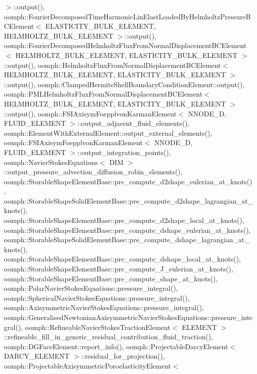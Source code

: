 $>$\+::output(), oomph\+::\+Fourier\+Decomposed\+Time\+Harmonic\+Lin\+Elast\+Loaded\+By\+Helmholtz\+Pressure\+B\+C\+Element$<$ E\+L\+A\+S\+T\+I\+C\+I\+T\+Y\+\_\+\+B\+U\+L\+K\+\_\+\+E\+L\+E\+M\+E\+N\+T, H\+E\+L\+M\+H\+O\+L\+T\+Z\+\_\+\+B\+U\+L\+K\+\_\+\+E\+L\+E\+M\+E\+N\+T $>$\+::output(), oomph\+::\+Fourier\+Decomposed\+Helmholtz\+Flux\+From\+Normal\+Displacement\+B\+C\+Element$<$ H\+E\+L\+M\+H\+O\+L\+T\+Z\+\_\+\+B\+U\+L\+K\+\_\+\+E\+L\+E\+M\+E\+N\+T, E\+L\+A\+S\+T\+I\+C\+I\+T\+Y\+\_\+\+B\+U\+L\+K\+\_\+\+E\+L\+E\+M\+E\+N\+T $>$\+::output(), oomph\+::\+Helmholtz\+Flux\+From\+Normal\+Displacement\+B\+C\+Element$<$ H\+E\+L\+M\+H\+O\+L\+T\+Z\+\_\+\+B\+U\+L\+K\+\_\+\+E\+L\+E\+M\+E\+N\+T, E\+L\+A\+S\+T\+I\+C\+I\+T\+Y\+\_\+\+B\+U\+L\+K\+\_\+\+E\+L\+E\+M\+E\+N\+T $>$\+::output(), oomph\+::\+Clamped\+Hermite\+Shell\+Boundary\+Condition\+Element\+::output(), oomph\+::\+P\+M\+L\+Helmholtz\+Flux\+From\+Normal\+Displacement\+B\+C\+Element$<$ H\+E\+L\+M\+H\+O\+L\+T\+Z\+\_\+\+B\+U\+L\+K\+\_\+\+E\+L\+E\+M\+E\+N\+T, E\+L\+A\+S\+T\+I\+C\+I\+T\+Y\+\_\+\+B\+U\+L\+K\+\_\+\+E\+L\+E\+M\+E\+N\+T $>$\+::output(), oomph\+::\+F\+S\+I\+Axisym\+Foepplvon\+Karman\+Element$<$ N\+N\+O\+D\+E\+\_\+D, F\+L\+U\+I\+D\+\_\+\+E\+L\+E\+M\+E\+N\+T $>$\+::output\+\_\+adjacent\+\_\+fluid\+\_\+elements(), oomph\+::\+Element\+With\+External\+Element\+::output\+\_\+external\+\_\+elements(), oomph\+::\+F\+S\+I\+Axisym\+Foepplvon\+Karman\+Element$<$ N\+N\+O\+D\+E\+\_\+D, F\+L\+U\+I\+D\+\_\+\+E\+L\+E\+M\+E\+N\+T $>$\+::output\+\_\+integration\+\_\+points(), oomph\+::\+Navier\+Stokes\+Equations$<$ D\+I\+M $>$\+::output\+\_\+pressure\+\_\+advection\+\_\+diffusion\+\_\+robin\+\_\+elements(), oomph\+::\+Storable\+Shape\+Element\+Base\+::pre\+\_\+compute\+\_\+d2shape\+\_\+eulerian\+\_\+at\+\_\+knots(), oomph\+::\+Storable\+Shape\+Solid\+Element\+Base\+::pre\+\_\+compute\+\_\+d2shape\+\_\+lagrangian\+\_\+at\+\_\+knots(), oomph\+::\+Storable\+Shape\+Element\+Base\+::pre\+\_\+compute\+\_\+d2shape\+\_\+local\+\_\+at\+\_\+knots(), oomph\+::\+Storable\+Shape\+Element\+Base\+::pre\+\_\+compute\+\_\+dshape\+\_\+eulerian\+\_\+at\+\_\+knots(), oomph\+::\+Storable\+Shape\+Solid\+Element\+Base\+::pre\+\_\+compute\+\_\+dshape\+\_\+lagrangian\+\_\+at\+\_\+knots(), oomph\+::\+Storable\+Shape\+Element\+Base\+::pre\+\_\+compute\+\_\+dshape\+\_\+local\+\_\+at\+\_\+knots(), oomph\+::\+Storable\+Shape\+Element\+Base\+::pre\+\_\+compute\+\_\+\+J\+\_\+eulerian\+\_\+at\+\_\+knots(), oomph\+::\+Storable\+Shape\+Element\+Base\+::pre\+\_\+compute\+\_\+shape\+\_\+at\+\_\+knots(), oomph\+::\+Polar\+Navier\+Stokes\+Equations\+::pressure\+\_\+integral(), oomph\+::\+Spherical\+Navier\+Stokes\+Equations\+::pressure\+\_\+integral(), oomph\+::\+Axisymmetric\+Navier\+Stokes\+Equations\+::pressure\+\_\+integral(), oomph\+::\+Generalised\+Newtonian\+Axisymmetric\+Navier\+Stokes\+Equations\+::pressure\+\_\+integral(), oomph\+::\+Refineable\+Navier\+Stokes\+Traction\+Element$<$ E\+L\+E\+M\+E\+N\+T $>$\+::refineable\+\_\+fill\+\_\+in\+\_\+generic\+\_\+residual\+\_\+contribution\+\_\+fluid\+\_\+traction(), oomph\+::\+D\+G\+Face\+Element\+::report\+\_\+info(), oomph\+::\+Projectable\+Darcy\+Element$<$ D\+A\+R\+C\+Y\+\_\+\+E\+L\+E\+M\+E\+N\+T $>$\+::residual\+\_\+for\+\_\+projection(), oomph\+::\+Projectable\+Axisymmetric\+Poroelasticity\+Element$<$ 